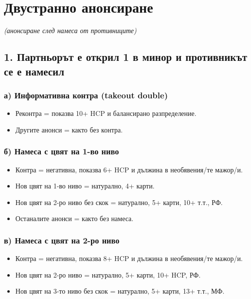 \documentclass[10pt,a5paper]{extarticle}
\begin{document}
\section{Двустранно анонсиране}
\textit{(анонсиране след намеса от противниците)}

\subsection*{1. Партньорът е открил 1 в минор и противникът се е намесил}

\subsubsection*{а) Информативна контра (takeout double)}
\begin{itemize}
  \item[] Реконтра = показва 10+ HCP и балансирано разпределение.
  \item[] Другите анонси = както без контра.
\end{itemize}

\subsubsection*{б) Намеса с цвят на 1-во ниво}
\begin{itemize}
  \item[] Контра = негативна, показва 6+ HCP и дължина в необявения/те мажор/и.
  \item[] Нов цвят на 1-во ниво = натурално, 4+ карти.
  \item[] Нов цвят на 2-ро ниво без скок = натурално, 5+ карти, 10+ т.т., РФ.
  \item[] Останалите анонси = както без намеса.
\end{itemize}

\subsubsection*{в) Намеса с цвят на 2-ро ниво}
\begin{itemize}
  \item[] Контра = негативна, показва 8+ HCP и дължина в необявения/те мажор/и.
  \item[] Нов цвят на 2-ро ниво = натурално, 5+ карти, 10+ HCP, РФ.
  \item[] Нов цвят на 3-то ниво без скок = натурално, 5+ карти, 13+ т.т., МФ.
\end{itemize}
\end{document}
